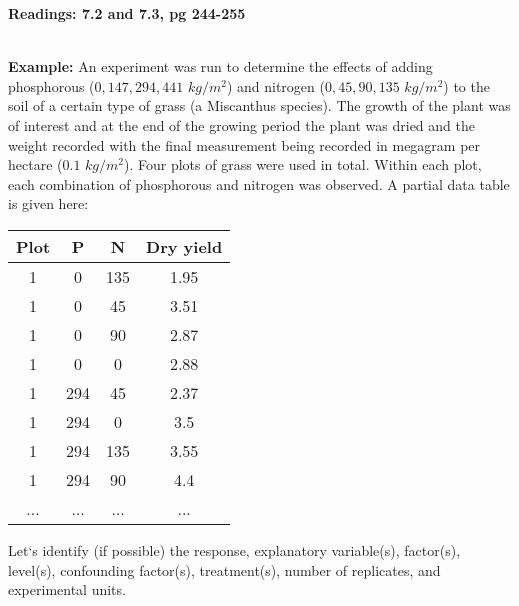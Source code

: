 \begin{center}\large\textbf{Readings: 7.2 and 7.3, pg 244-255}\\
\normalsize \end{center}
\large \hlinewd{2pt}
~\\
\textbf{Example: } An experiment was run to determine the effects of adding phosphorous ($0, 147, 294, 441$ $kg/m^2$) and nitrogen ($0, 45, 90, 135$ $kg/m^2$) to the soil of a certain type of grass (a Miscanthus species).  The growth of the plant was of interest and at the end of the growing period the plant was dried and the weight recorded with the final measurement being recorded in megagram per hectare ($0.1$ $kg/m^2$).  Four plots of grass were used in total.  Within each plot, each combination of phosphorous and nitrogen was observed.  A partial data table is given here: 
\begin{center}
\begin{tabular}{c|c|c|c}
\hline
Plot	&P	&N&	Dry yield\\
\hline
1&	0&	135&	1.95\\
1&	0&	45&	3.51\\
1&	0&	90&	2.87\\
1&	0&	0&	2.88\\
1&	294	&45&	2.37\\
1&	294	&0&	3.5\\
1&	294	&135&	3.55\\
1&	294&	90&	4.4\\
...&...&...&...\\
\end{tabular}
\end{center}
Let`s identify (if possible) the response, explanatory variable(s), factor(s), level(s), confounding factor(s), treatment(s), number of replicates, and experimental units.  \\

\newpage

